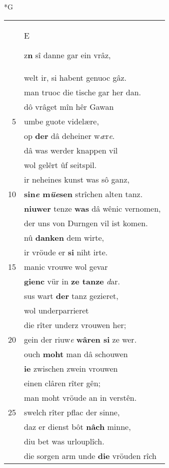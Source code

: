 \documentclass[8pt,a4paper,notitlepage]{article}
\begin{document}
\newpage
\begin{table}[ht]
\begin{minipage}[t]{0.5\linewidth}
\small
\begin{center}*G
\end{center}
\begin{tabular}{rl}
 & \begin{large}E\end{large}z\textbf{n} sî danne gar ein vrâz,\\ 
 & welt ir, si habent genuoc gâz.\\ 
 & man truoc die tische gar her dan.\\ 
 & dô vrâget mîn hêr Gawan\\ 
5 & umbe guote videlære,\\ 
 & op \textbf{der} dâ deheiner w\textit{æ}r\textit{e}.\\ 
 & dâ was werder knappen vil\\ 
 & wol gelêrt ûf seitspil.\\ 
 & ir neheines kunst was sô ganz,\\ 
10 & \textbf{sin\textit{e} m\textit{üe}sen} strîchen alten tanz.\\ 
 & \textbf{niuwer} tenze \textbf{was} dâ wênic vernomen,\\ 
 & der uns von Durngen vil ist komen.\\ 
 & nû \textbf{danken} dem wirte,\\ 
 & ir vröude er \textbf{si} niht irte.\\ 
15 & manic vrouwe wol gevar\\ 
 & \textbf{gienc} vür in \textbf{ze tanze} \textit{d}ar.\\ 
 & sus wart \textbf{der} tanz gezieret,\\ 
 & wol underparrieret\\ 
 & die rîter underz vrouwen her;\\ 
20 & gein der riuw\textit{e} \textbf{wâren si} ze wer.\\ 
 & ouch \textbf{moht} man dâ schouwen\\ 
 & \textbf{ie} zwischen zwein vrouwen\\ 
 & einen clâren rîter gên;\\ 
 & man moht vröude an in verstên.\\ 
25 & swelch rîter pflac der sinne,\\ 
 & daz er dienst bôt \textbf{nâch} minne,\\ 
 & diu bet was urlouplîch.\\ 
 & die sorgen arm unde \textbf{die} vröuden rîch\\ 

\end{tabular}
\end{minipage}
\end{table}
\end{document}
